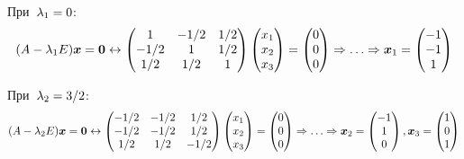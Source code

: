 \documentclass[a4paper,12pt]{article}
\theoremstyle{remark}
\begin{document}
\begin{solution}
    При~$\lambda_1 \hm= 0$:
    \[
      (A - \lambda_1 E) \boldsymbol x = \boldsymbol 0
      \leftrightarrow \begin{pmatrix}
        1    & -1/2 & 1/2\\
        -1/2 & 1    & 1/2\\
        1/2  & 1/2  & 1
      \end{pmatrix} \begin{pmatrix}
        x_1\\
        x_2\\
        x_3
      \end{pmatrix} = \begin{pmatrix}
        0\\
        0\\
        0
      \end{pmatrix}
      \Rightarrow \ldots \Rightarrow \boldsymbol x_1 = \begin{pmatrix}
        -1\\
        -1\\
        1
      \end{pmatrix}
    \]
    
    При~$\lambda_2 \hm= 3/2$:
    \[
      (A - \lambda_2 E) \boldsymbol x = \boldsymbol 0
      \leftrightarrow \begin{pmatrix}
        -1/2 & -1/2 & 1/2\\
        -1/2 & -1/2 & 1/2\\
        1/2  & 1/2  & -1/2
      \end{pmatrix} \begin{pmatrix}
        x_1\\
        x_2\\
        x_3
      \end{pmatrix} = \begin{pmatrix}
        0\\
        0\\
        0
      \end{pmatrix}
      \Rightarrow \ldots \Rightarrow \boldsymbol x_2 = \begin{pmatrix}
        -1\\
        1\\
        0
      \end{pmatrix},
      \boldsymbol x_3 = \begin{pmatrix}
        1\\
        0\\
        1
      \end{pmatrix}
    \]
    

\end{solution}
\end{document}
